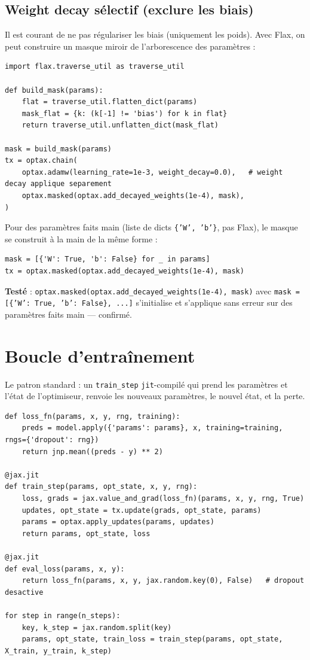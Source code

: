 \documentclass[11pt,a4paper]{article}
\begin{document}
\subsection{Weight decay sélectif (exclure les biais)}
Il est courant de ne pas régulariser les biais (uniquement les poids). Avec
Flax, on peut construire un masque miroir de l'arborescence des paramètres :
\begin{lstlisting}
import flax.traverse_util as traverse_util

def build_mask(params):
    flat = traverse_util.flatten_dict(params)
    mask_flat = {k: (k[-1] != 'bias') for k in flat}
    return traverse_util.unflatten_dict(mask_flat)

mask = build_mask(params)
tx = optax.chain(
    optax.adamw(learning_rate=1e-3, weight_decay=0.0),   # weight decay applique separement
    optax.masked(optax.add_decayed_weights(1e-4), mask),
)
\end{lstlisting}

Pour des paramètres faits main (liste de dicts \texttt{\{'W', 'b'\}}, pas
Flax), le masque se construit à la main de la même forme :
\begin{lstlisting}
mask = [{'W': True, 'b': False} for _ in params]
tx = optax.masked(optax.add_decayed_weights(1e-4), mask)
\end{lstlisting}

\begin{mdframed}
\textbf{Testé} : \texttt{optax.masked(optax.add\_decayed\_weights(1e-4), mask)}
avec \texttt{mask = [\{'W': True, 'b': False\}, ...]} s'initialise et
s'applique sans erreur sur des paramètres faits main --- confirmé.
\end{mdframed}

\section{Boucle d'entraînement}

Le patron standard : un \texttt{train\_step} \texttt{jit}-compilé qui prend
les paramètres et l'état de l'optimiseur, renvoie les nouveaux paramètres,
le nouvel état, et la perte.

\begin{lstlisting}
def loss_fn(params, x, y, rng, training):
    preds = model.apply({'params': params}, x, training=training, rngs={'dropout': rng})
    return jnp.mean((preds - y) ** 2)

@jax.jit
def train_step(params, opt_state, x, y, rng):
    loss, grads = jax.value_and_grad(loss_fn)(params, x, y, rng, True)
    updates, opt_state = tx.update(grads, opt_state, params)
    params = optax.apply_updates(params, updates)
    return params, opt_state, loss

@jax.jit
def eval_loss(params, x, y):
    return loss_fn(params, x, y, jax.random.key(0), False)   # dropout desactive

for step in range(n_steps):
    key, k_step = jax.random.split(key)
    params, opt_state, train_loss = train_step(params, opt_state, X_train, y_train, k_step)
\end{lstlisting}
\end{document}
